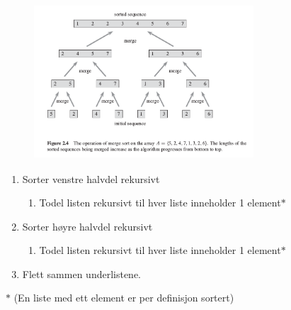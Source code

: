 \documentclass[12pt]{report}
\begin{document}




\begin{figure}[H]
\advance\leftskip 4.04in		\includegraphics[width=3.23in,height=2.27in]{./media/image22.png}
\end{figure}



\par

\begin{enumerate}[label*=\arabic*.]
	\item Sorter venstre halvdel rekursivt\par

\begin{enumerate}
	\item Todel listen rekursivt til hver liste inneholder 1 element$\ast$ 
\end{enumerate}\par

	\item Sorter høyre halvdel rekursivt\par

\begin{enumerate}
	\item Todel listen rekursivt til hver liste inneholder 1 element$\ast$  
\end{enumerate}\par

	\item Flett sammen underlistene.
\end{enumerate}\par


\vspace{\baselineskip}
$\ast$ (En liste med ett element er per definisjon sortert) \par
\end{document}
